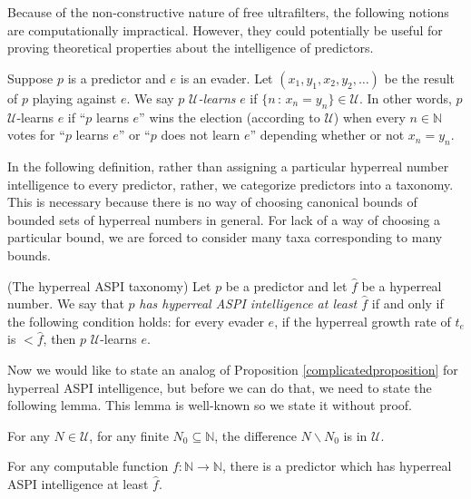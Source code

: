 \documentclass[twoside,11pt]{article}
\begin{document}
Because of the non-constructive nature of free ultrafilters, the following notions
are computationally impractical. However, they could potentially be useful for
proving theoretical properties about the intelligence of predictors.

\begin{definition}
\label{Ulearndefn}
    Suppose $p$ is a predictor and $e$ is an evader. Let
    $(x_1,y_1,x_2,y_2,\ldots)$ be the result of $p$ playing against $e$.
    We say $p$ \emph{$\mathcal U$-learns} $e$ if
    $\{n\,:\,x_n=y_n\}\in\mathcal U$.
    In other words, $p$ $\mathcal U$-learns $e$ if ``$p$ learns $e$''
    wins the election (according to $\mathcal U$)
    when every $n\in\mathbb N$ votes for ``$p$ learns $e$''
    or ``$p$ does not learn $e$'' depending whether or not $x_n=y_n$.
\end{definition}

In the following
definition, rather than assigning a particular hyperreal number intelligence to every
predictor, rather, we categorize predictors into a taxonomy.
This is necessary because there is no way of choosing canonical bounds
of bounded sets of hyperreal numbers in general. For lack of a way of
choosing a particular bound, we are forced to consider many taxa corresponding
to many bounds.

\begin{definition}
\label{hyperrealhibbardintelligencedefn}
    (The hyperreal ASPI taxonomy)
    Let $p$ be a predictor and let $\hat f$ be a hyperreal number.
    We say that $p$ \emph{has hyperreal ASPI intelligence at least $\hat f$}
    if and only if the following condition holds:
    for every evader $e$, if the hyperreal growth rate of $t_e$ is
    $<\hat f$, then $p$ $\mathcal U$-learns $e$.
\end{definition}

Now we would like to state an analog of Proposition \ref{complicatedproposition}
for hyperreal ASPI intelligence, but before we can do that, we need to state the
following lemma. This lemma is well-known so we state it without proof.

\begin{lemma}
\label{technicallemmaaboutultrafilters}
    For any $N\in\mathcal U$, for any finite $N_0\subseteq\mathbb N$,
    the difference $N\backslash N_0$ is in $\mathcal U$.
\end{lemma}

\begin{proposition}
    For any computable function $f:\mathbb N\to\mathbb N$, there is a predictor which has
    hyperreal ASPI intelligence at least $\hat f$.
\end{proposition}
\end{document}
